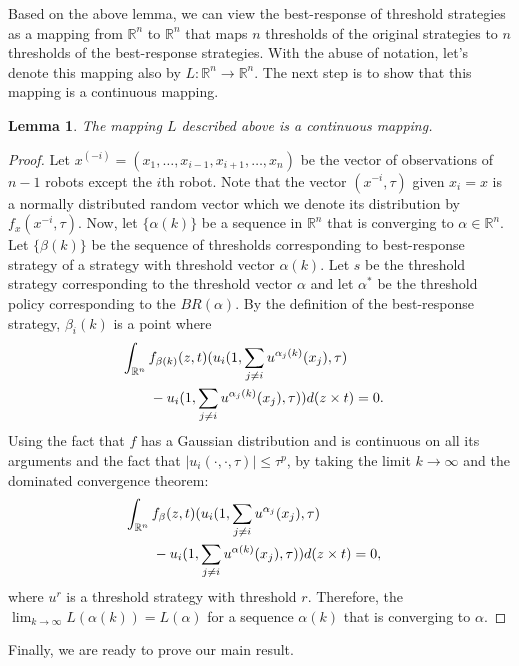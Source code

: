 \documentclass[conference]{ieeeconf}
\newtheorem{lemma}{Lemma}
\def\R{\mathbb{R}}
\begin{document}
Based on the above lemma, we can view the best-response of threshold strategies as a mapping from $\R^n$ to $\R^n$ that maps $n$ thresholds of the original strategies to $n$ thresholds of the best-response strategies. With the abuse of notation, let's denote this mapping also by $L:\R^n\to\R^n$. The next step is to show that this mapping is a continuous mapping. 
\begin{lemma}\label{lemma:continuous}
The mapping $L$ described above is a continuous mapping. 
\end{lemma}
\begin{proof}
Let $x^{(-i)}=(x_1,\ldots,x_{i-1},x_{i+1},\ldots,x_n)$ be the vector of observations of $n-1$ robots except the $i$th robot. Note that the vector $(x^{-i},\tau)$ given $x_i=x$ is a normally distributed random vector which we denote its distribution by $f_{x}(x^{-i},\tau)$. Now, let $\{\alpha(k)\}$ be a sequence in $\R^n$ that is converging to $\alpha\in\R^n$. Let $\{\beta(k)\}$ be the sequence of thresholds corresponding to best-response strategy of a strategy with threshold vector $\alpha(k)$. Let $s$ be the threshold strategy corresponding to the threshold vector $\alpha$ and let $\alpha^*$ be the threshold policy corresponding to the $BR(\alpha)$. By the definition of the best-response strategy, $\beta_i(k)$ is a point where 
\begin{align*}
&\int_{\R^{n}}f_{\beta(k)}(z,t)(u_i(1,\sum_{j\not=i}u^{\alpha_j(k)}(x_j),\tau)\cr 
&\qquad-u_i(1,\sum_{j\not=i}u^{\alpha_j(k)}(x_j),\tau))d(z\times t)=0.
\end{align*}
Using the fact that $f$ has a Gaussian distribution and is continuous on all its arguments and the fact that $|u_i(\cdot,\cdot,\tau)|\leq \tau^p$, by taking the limit $k\to\infty$ and the dominated convergence theorem:
\begin{align*}
&\int_{\R^{n}}f_{\beta}(z,t)(u_i(1,\sum_{j\not=i}u^{\alpha_j}(x_j),\tau)\cr 
&\qquad-u_i(1,\sum_{j\not=i}u^{\alpha(k)}(x_j),\tau))d(z\times t)=0,
\end{align*}
where $u^{r}$ is a threshold strategy with threshold $r$. Therefore, the $\lim_{k\to\infty}L(\alpha(k))=L(\alpha)$ for a sequence $\alpha(k)$ that is converging to $\alpha$.
\end{proof}
Finally, we are ready to prove our main result. 
\end{document}
